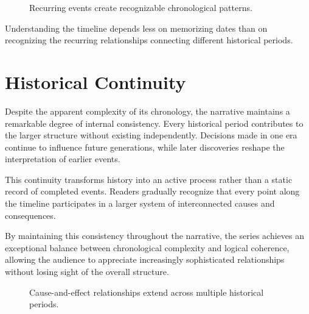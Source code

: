\documentclass[12pt,oneside,openany]{book}
\begin{document}
\begin{figure}[H]
\centering
{}
\caption{Recurring events create recognizable chronological patterns.}
\end{figure}

\begin{tcolorbox}[colback=green!6,colframe=green!50!black,title=Key Concept]
Understanding the timeline depends less on memorizing dates than on recognizing
the recurring relationships connecting different historical periods.
\end{tcolorbox}

\section{Historical Continuity}

Despite the apparent complexity of its chronology, the narrative maintains a
remarkable degree of internal consistency. Every historical period contributes
to the larger structure without existing independently. Decisions made in one
era continue to influence future generations, while later discoveries reshape
the interpretation of earlier events.

This continuity transforms history into an active process rather than a static
record of completed events. Readers gradually recognize that every point along
the timeline participates in a larger system of interconnected causes and
consequences.

By maintaining this consistency throughout the narrative, the series achieves
an exceptional balance between chronological complexity and logical coherence,
allowing the audience to appreciate increasingly sophisticated relationships
without losing sight of the overall structure.
\begin{figure}[H]
\centering
{}
\caption{Cause-and-effect relationships extend across multiple historical periods.}
\end{figure}
\end{document}
